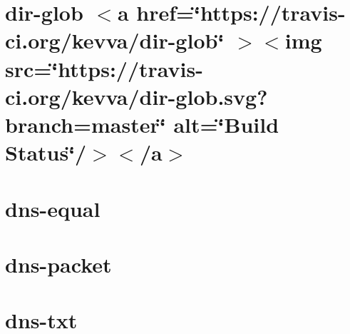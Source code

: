 \documentclass[twoside]{book}
\newcommand{\+}{\discretionary{\mbox{\scriptsize$\hookleftarrow$}}{}{}}
\begin{document}
\chapter{dir-\/glob \texorpdfstring{$<$}{<}a href=\char`\"{}https\+://travis-\/ci.\+org/kevva/dir-\/glob\char`\"{} \texorpdfstring{$>$}{>}\texorpdfstring{$<$}{<}img src=\char`\"{}https\+://travis-\/ci.\+org/kevva/dir-\/glob.\+svg?branch=master\char`\"{} alt=\char`\"{}\+Build Status\char`\"{}/\texorpdfstring{$>$}{>}\texorpdfstring{$<$}{<}/a\texorpdfstring{$>$}{>}}
\label{md__c___users_vaishnavi_jadhav__desktop__developer_code_mean_stack_example_client_node_modules_dir_glob_readme}

\chapter{dns-\/equal}
\label{md__c___users_vaishnavi_jadhav__desktop__developer_code_mean_stack_example_client_node_modules_dns_equal__r_e_a_d_m_e}

\chapter{dns-\/packet}
\label{md__c___users_vaishnavi_jadhav__desktop__developer_code_mean_stack_example_client_node_modules_dns_packet__r_e_a_d_m_e}

\chapter{dns-\/txt}
\label{md__c___users_vaishnavi_jadhav__desktop__developer_code_mean_stack_example_client_node_modules_dns_txt__r_e_a_d_m_e}

\end{document}
